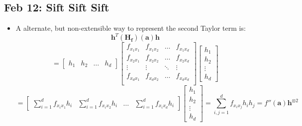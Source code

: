 \documentclass[10pt, oneside]{article}
\renewcommand{\vec}[1]{\mathbf{#1}}
\newcommand{\mat}[1]{\mathbf{#1}}
\begin{document}
\subsection{Feb 12: Sift Sift Sift}
\begin{itemize}
    \item A alternate, but non-extensible way to represent the second Taylor term is:
        \[\vec{h}^T (\mat{H_f}) (\vec{a}) \vec{h}\]
        \[= \begin{bmatrix}
            h_1 & h_2 & \hdots & h_d
        \end{bmatrix}
        \begin{bmatrix}
            f_{x_1 x_1} & f_{x_1 x_2} & \hdots & f_{x_1 x_d}\\
            f_{x_2 x_1} & f_{x_2 x_2} & \hdots & f_{x_2 x_d}\\
            \vdots      & \vdots      & \ddots & \vdots\\
            f_{x_d x_1} & f_{x_d x_2} & \hdots & f_{x_d x_d}\\
        \end{bmatrix}
        \begin{bmatrix}
            h_1\\
            h_2\\
            \vdots\\
            h_d
        \end{bmatrix}\]
        \[= \begin{bmatrix}
        \displaystyle \sum_{i=1}^d f_{x_i x_1} h_i & \displaystyle \sum_{i=1}^d f_{x_i x_2} h_i & \hdots & \displaystyle \sum_{i=1}^d f_{x_i x_d} h_i
        \end{bmatrix}
        \begin{bmatrix}
            h_1\\
            h_2\\
            \vdots\\
            h_d
        \end{bmatrix}
        =\sum_{i,j = 1}^d f_{x_i x_j} h_i h_j = f''(\vec{a}) \vec{h}^{\otimes 2}\]
\end{itemize}
\end{document}
